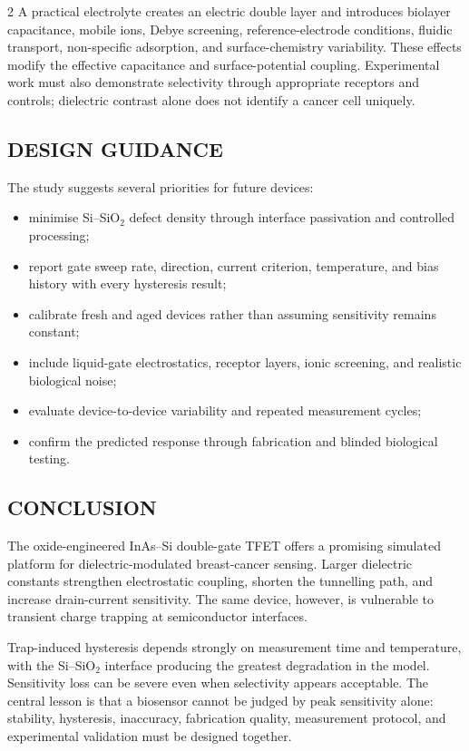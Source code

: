 \begin{multicols}{2}
  \noindent
  A practical electrolyte creates an electric double layer and introduces biolayer capacitance, mobile ions, Debye screening, reference-electrode conditions, fluidic transport, non-specific adsorption, and surface-chemistry variability. These effects modify the effective capacitance and surface-potential coupling. Experimental work must also demonstrate selectivity through appropriate receptors and controls; dielectric contrast alone does not identify a cancer cell uniquely.

  \subsection*{\centering\uppercase{Design Guidance}}
  The study suggests several priorities for future devices:
  \begin{itemize}\justifying
    \item minimise Si--SiO$_2$ defect density through interface passivation and controlled processing;
    \item report gate sweep rate, direction, current criterion, temperature, and bias history with every hysteresis result;
    \item calibrate fresh and aged devices rather than assuming sensitivity remains constant;
    \item include liquid-gate electrostatics, receptor layers, ionic screening, and realistic biological noise;
    \item evaluate device-to-device variability and repeated measurement cycles;
    \item confirm the predicted response through fabrication and blinded biological testing.
  \end{itemize}

  \subsection*{\centering\uppercase{Conclusion}}
  The oxide-engineered InAs--Si double-gate TFET offers a promising simulated platform for dielectric-modulated breast-cancer sensing. Larger dielectric constants strengthen electrostatic coupling, shorten the tunnelling path, and increase drain-current sensitivity. The same device, however, is vulnerable to transient charge trapping at semiconductor interfaces.

  \noindent
  Trap-induced hysteresis depends strongly on measurement time and temperature, with the Si--SiO$_2$ interface producing the greatest degradation in the model. Sensitivity loss can be severe even when selectivity appears acceptable. The central lesson is that a biosensor cannot be judged by peak sensitivity alone: stability, hysteresis, inaccuracy, fabrication quality, measurement protocol, and experimental validation must be designed together.


\end{multicols}
